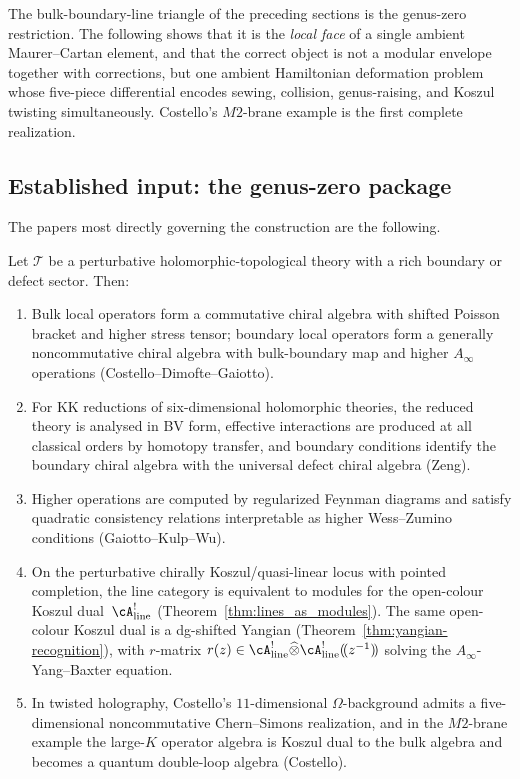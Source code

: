 The bulk-boundary-line triangle of the preceding sections
is the genus-zero restriction. The following shows that it is the \emph{local face}
of a single ambient Maurer--Cartan element, and that the correct
object is not a modular envelope together with corrections, but one
ambient Hamiltonian deformation problem whose five-piece differential
encodes sewing, collision, genus-raising, and Koszul twisting
simultaneously. Costello's $M2$-brane example is the first
complete realization.

\subsection{Established input: the genus-zero package}
\label{subsec:established-genus-zero-package}

The papers most directly governing the construction are the
following.

\begin{theorem}
\label{thm:genus-zero-holographic-spine}
\ClaimStatusProvedElsewhere
Let $\mathcal{T}$ be a perturbative holomorphic-topological theory
with a rich boundary or defect sector. Then:
\begin{enumerate}[label=\textup{(\arabic*)}]
\item Bulk local operators form a commutative chiral algebra with
shifted Poisson bracket and higher stress tensor; boundary local
operators form a generally noncommutative chiral algebra with
bulk-boundary map and higher $A_\infty$ operations
\textup{(Costello--Dimofte--Gaiotto)}.
\item For KK reductions of six-dimensional holomorphic theories,
the reduced theory is analysed in BV form, effective interactions
are produced at all classical orders by homotopy transfer, and
boundary conditions identify the boundary chiral algebra with the
universal defect chiral algebra \textup{(Zeng)}.
\item Higher operations are computed by regularized Feynman diagrams
and satisfy quadratic consistency relations interpretable as higher
Wess--Zumino conditions \textup{(Gaiotto--Kulp--Wu)}.
\item On the perturbative chirally Koszul/quasi-linear locus with
 pointed completion, the line category is equivalent to modules for
 the open-colour Koszul dual~$\cA^!_{\mathrm{line}}$
 \textup{(}Theorem~\textup{\ref{thm:lines_as_modules}}\textup{)}.
 The same open-colour Koszul dual is a dg-shifted Yangian
 \textup{(}Theorem~\textup{\ref{thm:yangian-recognition}}\textup{)},
 with $r$-matrix
 $r(z) \in \cA^!_{\mathrm{line}} \widehat\otimes
 \cA^!_{\mathrm{line}}(\!(z^{-1})\!)$
 solving the $A_\infty$-Yang--Baxter equation.
\item In twisted holography, Costello's $11$-dimensional
$\Omega$-background admits a five-dimensional noncommutative
Chern--Simons realization, and in the $M2$-brane example the
large-$K$ operator algebra is Koszul dual to the bulk algebra
and becomes a quantum double-loop algebra \textup{(Costello)}.
\end{enumerate}
\end{theorem}

